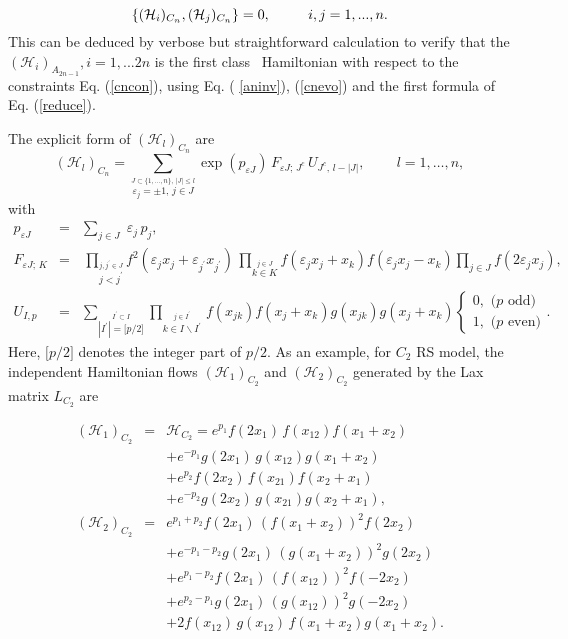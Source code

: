\documentclass[a4paper,12pt]{article}
\begin{document}
\begin{equation}
\{(\mathcal{H}_{i})_{C_{n}},(\mathcal{H}_{j})_{C_{n}}\}=0,
\mbox{$ \ \ \ \ \ \ \ \
$}i,j=1,...,n.
\end{equation}
This can be deduced by verbose but straightforward
calculation to verify that the
$(\mathcal{H}_{i})_{A_{2n-1}},i=1,...2n$ is the first class
\ Hamiltonian with respect to the constraints Eq.
(\ref{cncon}), using Eq. ( \ref{aninv}), (\ref{cnevo}) and
the first formula of Eq. (\ref{reduce}).

The explicit form of $(\mathcal{H}_{l})_{C_{n}}$ are
\begin{equation}
(\mathcal{H}_{l})_{C_{n}}=\sum_{\stackrel{J\subset
\{1,\ldots ,n\},\,|J|\leq l}{\varepsilon _{j}=\pm 1,\,j\in
J}}\mathrm{\exp }(p_{\varepsilon J})\,F_{\varepsilon
J;\,J^{c}}\,U_{J^{c},\,l-|J|},\;\;\;\;\;\;\;\;l=1,\ldots ,n,
\end{equation}
with
\begin{eqnarray}
p_{\varepsilon J} &=&\sum_{j\in J}\;\varepsilon _{j}\,p_{j},
\nonumber \\ F_{\varepsilon J;\,K}
&=&\,\prod_{\stackrel{j,j^{\prime }\in J}{j<j^{\prime }
}}f^{2}(\varepsilon _{j}x_{j}+\varepsilon _{j^{\prime
}}x_{j^{\prime }})\,\prod_{\stackrel{j\in J}{k\in
K}}f(\varepsilon
_{j}x_{j}+x_{k})f(\varepsilon _{j}x_{j}-x_{k})\prod_{j\in J}f(2\varepsilon
_{j}x_{j}), \\
U_{I,p} &=&\sum_{\stackrel{I^{\prime }\subset I}{|I^{\prime
}|=\lbrack p/2\rbrack }}\prod_{\stackrel{j\in I^{\prime
}}{k\in I\backslash I^{\prime }}
\,}f(x_{jk})f(x_{j}+x_{k})g(x_{jk})g(x_{j}+x_{k})\left\{
\begin{array}{c}
0,\mbox{ \ ($p$ odd)} \\ 1,\mbox{ \ ($p$ even)}
\end{array}
\right..\nonumber
\end{eqnarray}
Here, $\lbrack p/2\rbrack $ denotes the integer part of
$p/2$. As an example, for $C_{2}$ RS model, the independent
Hamiltonian flows $(\mathcal{H}_{1})_{C_{2}}$ and
$(\mathcal{H}_{2})_{C_{2}}$ generated by the Lax matrix $
L_{C_{2}}$ are\cite{kai3}

\begin{eqnarray}
(\mathcal{H}_{1})_{C_{2}}
&=&\mathcal{H}_{C_{2}}=e^{p_{1}}f(2x_{1})
\,f(x_{12})f(x_{1}+x_{2})  \nonumber \\
&&+e^{-p_{1}}g(2x_{1})\,g(x_{12})g(x_{1}+x_{2})	 \nonumber
\\ &&+e^{p_{2}}f(2x_{2})\,f(x_{21})f(x_{2}+x_{1})  \nonumber
\\ &&+e^{-p_{2}}g(2x_{2})\,g(x_{21})g(x_{2}+x_{1}), \\
(\mathcal{H}_{2})_{C_{2}}
&=&e^{p_{1}+p_{2}}f(2x_{1})\,(f(x_{1}+x_{2}))^{2}f(2x_{2})
\nonumber \\
&&+e^{-p_{1}-p_{2}}g(2x_{1})\,(g(x_{1}+x_{2}))^{2}g(2x_{2})
\nonumber \\
&&+e^{p_{1}-p_{2}}f(2x_{1})\,(f(x_{12}))^{2}f(-2x_{2})
\nonumber \\
&&+e^{p_{2}-p_{1}}g(2x_{1})\,(g(x_{12}))^{2}g(-2x_{2})
\nonumber \\
&&+2f(x_{12})\,g(x_{12})\,f(x_{1}+x_{2})g(x_{1}+x_{2}).
\end{eqnarray}
\end{document}
